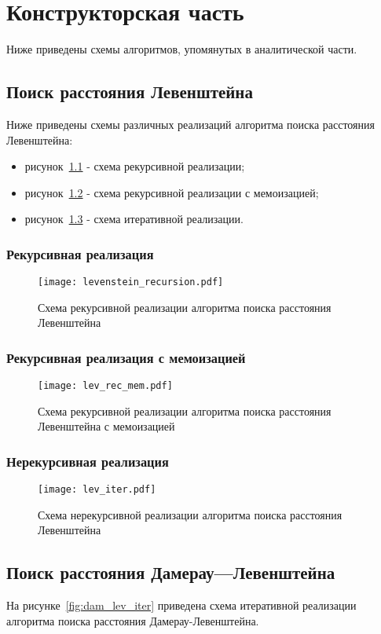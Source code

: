 \chapter{Конструкторская часть}

Ниже приведены схемы алгоритмов, упомянутых в аналитической части.
\section{Поиск расстояния Левенштейна}
Ниже приведены схемы различных реализаций алгоритма поиска расстояния Левенштейна:
\begin{itemize}
	\item рисунок~\ref{fig:lev_rec} - схема рекурсивной реализации;
	\item рисунок~\ref{fig:lev_rec_mem} - схема рекурсивной реализации с мемоизацией;
	\item рисунок~\ref{fig:lev_iter} - схема итеративной реализации.
\end{itemize}
\subsection{Рекурсивная реализация }
\begin{figure}[H]
	\centering
	\texttt{[image: levenstein\_recursion.pdf]}
	\caption{Схема рекурсивной реализации алгоритма поиска расстояния Левенштейна}
	\label{fig:lev_rec}
\end{figure}
\subsection{Рекурсивная реализация с мемоизацией}
\begin{figure}[H]
	\centering
	\texttt{[image: lev\_rec\_mem.pdf]}
	\caption{Схема рекурсивной реализации алгоритма поиска расстояния Левенштейна с мемоизацией}
	\label{fig:lev_rec_mem}
\end{figure}
\subsection{Нерекурсивная реализация }
\begin{figure}[H]
	\centering
	\texttt{[image: lev\_iter.pdf]}
	\caption{Схема нерекурсивной реализации алгоритма поиска расстояния Левенштейна}
	\label{fig:lev_iter}
\end{figure}
\section{Поиск расстояния Дамерау---Левенштейна}
На рисунке~\ref{fig:dam_lev_iter} приведена схема итеративной реализации алгоритма поиска расстояния Дамерау-Левенштейна.
